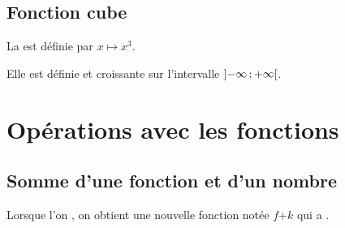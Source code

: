 \documentclass[12pt,a4paper]{article}
\begin{document}
	
	\subsection{Fonction cube}
	
	
	\begin{mydef}
		La  est définie par $x \mapsto x^3$.			
	\end{mydef}
	
	\begin{myprops}
		Elle est définie et croissante sur l'intervalle $\mbox{\ensuremath{\left]- \infty \mathpunct{};+ \infty\right[}}$.
			 
		
	\end{myprops}
	
	
	
	\section{Opérations avec les fonctions}
	
	\subsection{Somme d'une fonction et d'un nombre}
	
	\begin{myprop}
		Lorsque l'on , on obtient une nouvelle fonction notée $f$+$k$ qui a .
	\end{myprop}
	
\end{document}
